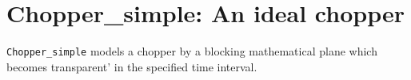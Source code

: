 \section{Chopper\_simple: An ideal chopper}

\texttt{Chopper\_simple} models a chopper by a blocking mathematical plane which becomes transparent'
in the specified time interval. 

